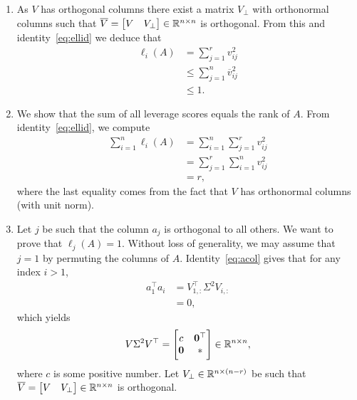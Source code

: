 \documentclass{article}
\begin{document}
\begin{enumerate}[label=\alph*)]
\item As $V$ has orthogonal columns there exist a matrix $V_\bot$ with
  orthonormal columns such that $\overline{V} =
  \begin{bmatrix}
    V & V_\bot
  \end{bmatrix} \in {\mathbb R}^{n \times n}
  $ is orthogonal.
  From this and identity~\eqref{eq:ellid} we deduce that
  \begin{align*}
    \ell_i(A) &= \sum_{j = 1}^r v_{ij}^2\\
              &\leq \sum_{j = 1}^n \overline{v}_{ij}^2\\
              &\leq 1.
  \end{align*}
\item We show that the sum of all leverage scores equals the rank of $A$.
  From identity~\ref{eq:ellid}, we compute
  \begin{align*}
    \sum_{i = 1}^n \ell_i(A) &= \sum_{i = 1}^n \sum_{j = 1}^r v_{ij}^2\\
                            &= \sum_{j = 1}^r \sum_{i = 1}^n v_{ij}^2\\
                            &= r,
  \end{align*}
  where the last equality comes from the fact that $V$ has orthonormal columns
  (with unit norm).
\item Let $j$ be such that the column $a_j$ is orthogonal to all others.
  We want to prove that $\ell_j(A) = 1$.
  Without loss of generality, we may
  assume that $j = 1$ by permuting the columns of $A$.
  Identity~\eqref{eq:acol} gives that for any index $i > 1$,
  \begin{align*}
    a_1^\top a_i &= V_{1,:}^\top \Sigma^2 V_{i,:}\\
    &= 0,
  \end{align*}
  which yields
  \begin{align}\label{eq:orthocol}
    V \Sigma^2 V^\top =
    \begin{bmatrix*}
      c & \zeros^\top\\
      \zeros & *
    \end{bmatrix*} \in \reals^{n \times n},
  \end{align}
  where $c$ is some positive number.
  Let $V_\bot \in {\mathbb R}^{n \times (n - r)}$ be such that $\overline{V} =
  \begin{bmatrix}
    V & V_\bot
  \end{bmatrix} \in {\mathbb R}^{n \times n}
  $ is orthogonal.

\end{enumerate}
\end{document}
